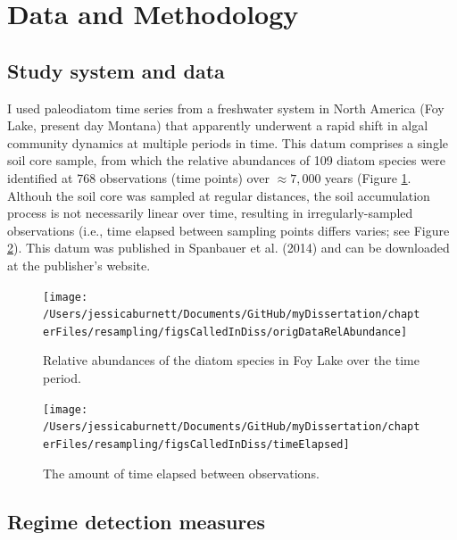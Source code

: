 \documentclass[12pt,twoside,openany]{reedthesis}
\begin{document}
\hypertarget{data-and-methodology}{%
\section{Data and Methodology}\label{data-and-methodology}}

\hypertarget{study-system-and-data}{%
\subsection{Study system and data}\label{study-system-and-data}}

I used paleodiatom time series from a freshwater system in North America (Foy Lake, present day Montana) that apparently underwent a rapid shift in algal community dynamics at multiple periods in time. This datum comprises a single soil core sample, from which the relative abundances of 109 diatom species were identified at 768 observations (time points) over \(\approx7,000\) years (Figure \ref{fig:origDat}. Althouh the soil core was sampled at regular distances, the soil accumulation process is not necessarily linear over time, resulting in irregularly-sampled observations (i.e., time elapsed between sampling points differs varies; see Figure \ref{fig:timeElapsed}). This datum was published in Spanbauer et al. (2014) and can be downloaded at the publisher's website.
\begin{figure}

{\centering \texttt{[image: /Users/jessicaburnett/Documents/GitHub/myDissertation/chapterFiles/resampling/figsCalledInDiss/origDataRelAbundance]} 

}

\caption{Relative abundances of the diatom species in Foy Lake over the time period.}\label{fig:origDat}
\end{figure}
\begin{figure}

{\centering \texttt{[image: /Users/jessicaburnett/Documents/GitHub/myDissertation/chapterFiles/resampling/figsCalledInDiss/timeElapsed]} 

}

\caption{The amount of time elapsed between observations.}\label{fig:timeElapsed}
\end{figure}
\hypertarget{regime-detection-measures}{%
\subsection{Regime detection measures}\label{regime-detection-measures}}
\end{document}
